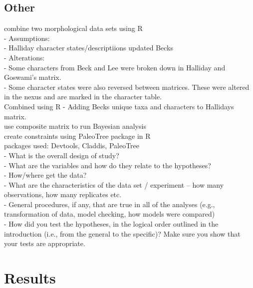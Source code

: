 \documentclass[a4paper,11pt]{article}
\begin{document}
\subsection{Other}

combine two morphological data sets using R \\
- Assumptions: \\ 
- Halliday character states/descriptiions updated Becks\\ 

- Alterations:\\
- Some characters from Beck and Lee were broken down in Halliday and Goswami’s matrix. \\
- Some character states were also reversed between matrices. These were altered in the nexus and are marked in the character table. \\
 
Combined using R - Adding Becks unique taxa and characters to Hallidays matrix. \\ 

use composite %
 matrix to run Bayesian analysis\\
create constraints using PaleoTree package in R\\
packages used: Devtools, Claddis, PaleoTree \\

- What is the overall design of study?\\ %
- What are the variables and how do they relate to the hypotheses?\\
- How/where get the data?\\
- What are the characteristics of the data set / experiment -- how many observations, how many replicates etc.\\
- General procedures, if any, that are true in all of the analyses (e.g., transformation of data, model checking, how models were compared)\\
- How did you test the hypotheses, in the logical order outlined in the introduction (i.e., from the general to the specific)? Make sure you show that your tests are appropriate.\\

\section{Results} 
\end{document}
